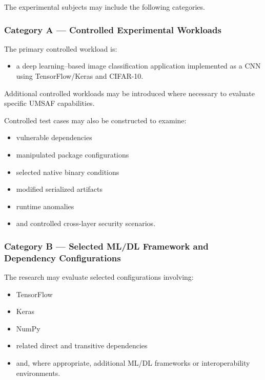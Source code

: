 \documentclass[
  12pt,
  letterpaper,
  oneside]{report}
\providecommand{\tightlist}{%
  \setlength{\itemsep}{0pt}\setlength{\parskip}{0pt}}
\begin{document}
The experimental subjects may include the following categories.

\subsubsection{Category A --- Controlled Experimental
Workloads}\label{category-a--controlled-experimental-workloads}

The primary controlled workload is:

\begin{itemize}
\tightlist
\item
  a deep learning--based image classification application implemented as
  a CNN using TensorFlow/Keras and CIFAR-10.
\end{itemize}

Additional controlled workloads may be introduced where necessary to
evaluate specific UMSAF capabilities.

Controlled test cases may also be constructed to examine:

\begin{itemize}
\tightlist
\item
  vulnerable dependencies
\item
  manipulated package configurations
\item
  selected native binary conditions
\item
  modified serialized artifacts
\item
  runtime anomalies
\item
  and controlled cross-layer security scenarios.
\end{itemize}

\subsubsection{Category B --- Selected ML/DL Framework and Dependency
Configurations}\label{category-b--selected-mldl-framework-and-dependency-configurations}

The research may evaluate selected configurations involving:

\begin{itemize}
\tightlist
\item
  TensorFlow
\item
  Keras
\item
  NumPy
\item
  related direct and transitive dependencies
\item
  and, where appropriate, additional ML/DL frameworks or
  interoperability environments.
\end{itemize}
\end{document}
